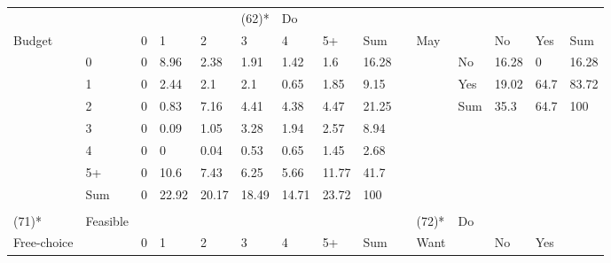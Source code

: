 \begin{center}
\begin{landscape}
\begin{longtable}{lllllllllllllll}
   &
   &
   &
    &
   &
  (62)* &
  Do &
   &
   &
    \\
Budget &
   &
  0 &
  1 &
  2 &
  3 &
  4 &
  5+ &
  Sum &
    &
  May &
   &
  No &
  Yes &
  Sum \\
 &
  0 &
  \cellcolor[HTML]{FFFFFF}0 &
  \cellcolor[HTML]{BCBCBC}8.96 &
  \cellcolor[HTML]{EEEEEE}2.38 &
  \cellcolor[HTML]{F1F1F1}1.91 &
  \cellcolor[HTML]{F5F5F5}1.42 &
  \cellcolor[HTML]{F3F3F3}1.6 &
  16.28 &
   &
   &
  No &
  \cellcolor[HTML]{E9E9E9}16.28 &
  \cellcolor[HTML]{FFFFFF}0 &
  16.28 \\
 &
  1 &
  \cellcolor[HTML]{FFFFFF}0 &
  \cellcolor[HTML]{EDEDED}2.44 &
  \cellcolor[HTML]{F0F0F0}2.1 &
  \cellcolor[HTML]{F0F0F0}2.1 &
  \cellcolor[HTML]{FBFBFB}0.65 &
  \cellcolor[HTML]{F2F2F2}1.85 &
  9.15 &
   &
   &
  Yes &
  \cellcolor[HTML]{E5E5E5}19.02 &
  \cellcolor[HTML]{A6A6A6}64.7 &
  83.72 \\
 &
  2 &
  \cellcolor[HTML]{FFFFFF}0 &
  \cellcolor[HTML]{F9F9F9}0.83 &
  \cellcolor[HTML]{C9C9C9}7.16 &
  \cellcolor[HTML]{DEDEDE}4.41 &
  \cellcolor[HTML]{DEDEDE}4.38 &
  \cellcolor[HTML]{DEDEDE}4.47 &
  21.25 &
   &
   &
  Sum &
  35.3 &
  64.7 &
  100 \\
 &
  3 &
  \cellcolor[HTML]{FFFFFF}0 &
  \cellcolor[HTML]{FFFFFF}0.09 &
  \cellcolor[HTML]{F8F8F8}1.05 &
  \cellcolor[HTML]{E7E7E7}3.28 &
  \cellcolor[HTML]{F1F1F1}1.94 &
  \cellcolor[HTML]{ECECEC}2.57 &
  8.94 &
   &
   &
   &
   &
   &
    \\
 &
  4 &
  \cellcolor[HTML]{FFFFFF}0 &
  \cellcolor[HTML]{FFFFFF}0 &
  \cellcolor[HTML]{FFFFFF}0.04 &
  \cellcolor[HTML]{FBFBFB}0.53 &
  \cellcolor[HTML]{FBFBFB}0.65 &
  \cellcolor[HTML]{F5F5F5}1.45 &
  2.68 &
   &
   &
   &
   &
   &
    \\
 &
  5+ &
  \cellcolor[HTML]{FFFFFF}0 &
  \cellcolor[HTML]{AFAFAF}10.6 &
  \cellcolor[HTML]{C7C7C7}7.43 &
  \cellcolor[HTML]{D0D0D0}6.25 &
  \cellcolor[HTML]{D5D5D5}5.66 &
  \cellcolor[HTML]{A6A6A6}11.77 &
  41.7 &
   &
   &
   &
   &
   &
    \\
  &
  Sum &
  0 &
  22.92 &
  20.17 &
  18.49 &
  14.71 &
  23.72 &
  100 &
    &
    &
    &
    &
    &
    \\
  &
    &
    &
    &
    &
    &
    &
    &
    &
    &
    &
    &
    &
    &
    \\
(71)* &
  Feasible &
   &
   &
   &
   &
   &
   &
    &
   &
  (72)* &
  Do &
   &
   &
    \\
Free-choice &
   &
  0 &
  1 &
  2 &
  3 &
  4 &
  5+ &
  Sum &
    &
  Want &
   &
  No &
  Yes &

\end{longtable}
\end{landscape}
\end{center}
